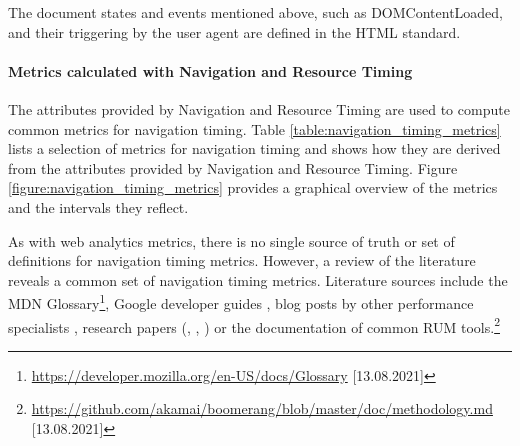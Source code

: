 The document states and events mentioned above, such as DOMContentLoaded, and their triggering by the user agent are defined in the HTML standard.











\paragraph{Metrics calculated with Navigation and Resource Timing} %

The attributes provided by Navigation and Resource Timing are used to compute common metrics for navigation timing.
Table \ref{table:navigation_timing_metrics} lists a selection of metrics for navigation timing and shows how they are derived from the attributes provided by Navigation and Resource Timing.
Figure \ref{figure:navigation_timing_metrics} provides a graphical overview of the metrics and the intervals they reflect.

As with web analytics metrics, there is no single source of truth or set of definitions for navigation timing metrics.
However, a review of the literature reveals a common set of navigation timing metrics.
Literature sources include the MDN Glossary\footnote{\url{https://developer.mozilla.org/en-US/docs/Glossary} [13.08.2021]},
Google developer guides \cite{2020Wagner},
blog posts by other performance specialists \cite{2020GTmetrix},
research papers (\cite{2013Wang}, \cite{2018Netravali}, \cite{2019Enghardt})
or the documentation of common RUM tools.\footnote{\url{https://github.com/akamai/boomerang/blob/master/doc/methodology.md} [13.08.2021]}

